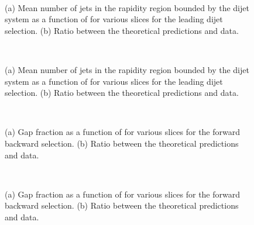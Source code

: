 \begin{figure}
\centering
\mbox{
              \quad
              \quad
}
\caption[Mean number of jets as a function of \dy{} for leading \pt{} dijet selection]{ 
(a) Mean number of jets in the rapidity region bounded by the dijet system as a function of \dy{} for various \ptb{} slices for the leading \pt{} dijet selection. 
(b) Ratio between the theoretical predictions and data. 
\label{GBJ1:NjetsdYSelA}}
\end{figure}

\begin{figure}
\centering
\mbox{
              \quad
              \quad
}
\caption[Mean number of jets as a function of \ptb{} for leading $p_T$ dijet selection]{ 
(a) Mean number of jets in the rapidity region bounded by the dijet system as a function of \ptb{} for various \dy{} slices for the leading \pt{} dijet selection. 
(b) Ratio between the theoretical predictions and data.
\label{GBJ1:NjetspTSelA}}
\end{figure}


\begin{figure}
\centering
\mbox{
              \quad
              \quad
}
\caption[Gap fraction as a function of \dy{} for forward backward selection]{ 
(a) Gap fraction as a function of \dy{} for various \ptb{} slices for the forward backward selection. 
(b) Ratio between the theoretical predictions and data. 
\label{GBJ1:dYSelB}}
\end{figure}

\begin{figure}
\centering
\mbox{
              \quad
              \quad
}
\caption[Gap fraction as a function of \ptb{} for forward backward selection]{ 
(a) Gap fraction as a function of \ptb{} for various \dy{} slices for the forward backward selection. 
(b) Ratio between the theoretical predictions and data.
\label{GBJ1:pTSelB}}
\end{figure}

